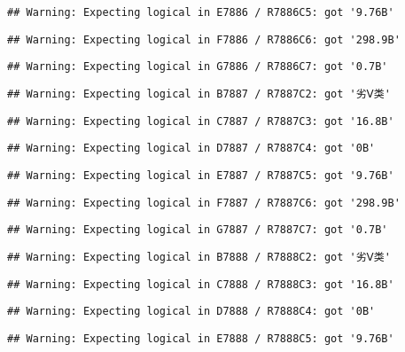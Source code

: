\documentclass[
]{article}
\begin{document}
\begin{verbatim}
## Warning: Expecting logical in E7886 / R7886C5: got '9.76B'
\end{verbatim}

\begin{verbatim}
## Warning: Expecting logical in F7886 / R7886C6: got '298.9B'
\end{verbatim}

\begin{verbatim}
## Warning: Expecting logical in G7886 / R7886C7: got '0.7B'
\end{verbatim}

\begin{verbatim}
## Warning: Expecting logical in B7887 / R7887C2: got '劣Ⅴ类'
\end{verbatim}

\begin{verbatim}
## Warning: Expecting logical in C7887 / R7887C3: got '16.8B'
\end{verbatim}

\begin{verbatim}
## Warning: Expecting logical in D7887 / R7887C4: got '0B'
\end{verbatim}

\begin{verbatim}
## Warning: Expecting logical in E7887 / R7887C5: got '9.76B'
\end{verbatim}

\begin{verbatim}
## Warning: Expecting logical in F7887 / R7887C6: got '298.9B'
\end{verbatim}

\begin{verbatim}
## Warning: Expecting logical in G7887 / R7887C7: got '0.7B'
\end{verbatim}

\begin{verbatim}
## Warning: Expecting logical in B7888 / R7888C2: got '劣Ⅴ类'
\end{verbatim}

\begin{verbatim}
## Warning: Expecting logical in C7888 / R7888C3: got '16.8B'
\end{verbatim}

\begin{verbatim}
## Warning: Expecting logical in D7888 / R7888C4: got '0B'
\end{verbatim}

\begin{verbatim}
## Warning: Expecting logical in E7888 / R7888C5: got '9.76B'
\end{verbatim}
\end{document}

